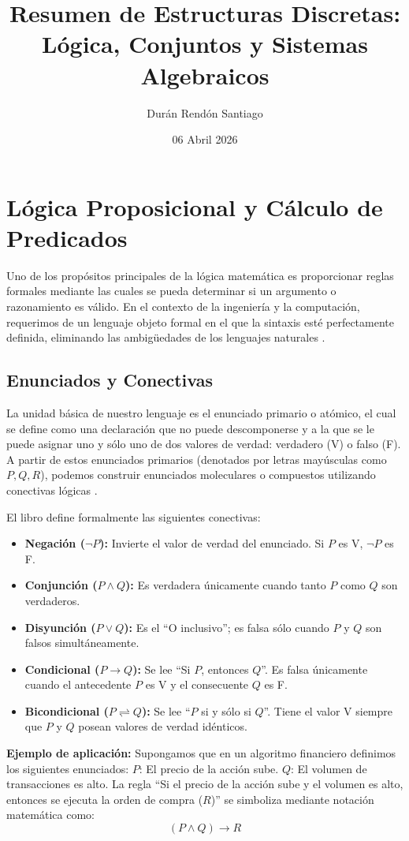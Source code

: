 \documentclass[12pt, letterpaper]{article}
\title{\textbf{Resumen de Estructuras Discretas: Lógica, Conjuntos y Sistemas Algebraicos}}
\author{Durán Rendón Santiago}
\date{06 Abril 2026}
\begin{document}


\tableofcontents

\section{Lógica Proposicional y Cálculo de Predicados}

Uno de los propósitos principales de la lógica matemática es proporcionar reglas formales mediante las cuales se pueda determinar si un argumento o razonamiento es válido. En el contexto de la ingeniería y la computación, requerimos de un lenguaje objeto formal en el que la sintaxis esté perfectamente definida, eliminando las ambigüedades de los lenguajes naturales \cite{tremblay2000matematicas}.

\subsection{Enunciados y Conectivas}
La unidad básica de nuestro lenguaje es el enunciado primario o atómico, el cual se define como una declaración que no puede descomponerse y a la que se le puede asignar uno y sólo uno de dos valores de verdad: verdadero (V) o falso (F). A partir de estos enunciados primarios (denotados por letras mayúsculas como $P, Q, R$), podemos construir enunciados moleculares o compuestos utilizando conectivas lógicas \cite{tremblay2000matematicas}.

El libro define formalmente las siguientes conectivas:
\begin{itemize}
    \item \textbf{Negación ($\neg P$):} Invierte el valor de verdad del enunciado. Si $P$ es V, $\neg P$ es F.
    \item \textbf{Conjunción ($P \wedge Q$):} Es verdadera únicamente cuando tanto $P$ como $Q$ son verdaderos.
    \item \textbf{Disyunción ($P \vee Q$):} Es el ``O inclusivo''; es falsa sólo cuando $P$ y $Q$ son falsos simultáneamente.
    \item \textbf{Condicional ($P \rightarrow Q$):} Se lee ``Si $P$, entonces $Q$''. Es falsa únicamente cuando el antecedente $P$ es V y el consecuente $Q$ es F.
    \item \textbf{Bicondicional ($P \rightleftharpoons Q$):} Se lee ``$P$ si y sólo si $Q$''. Tiene el valor V siempre que $P$ y $Q$ posean valores de verdad idénticos.
\end{itemize}

\textbf{Ejemplo de aplicación:}
Supongamos que en un algoritmo financiero definimos los siguientes enunciados:
$P$: El precio de la acción sube.
$Q$: El volumen de transacciones es alto.
La regla ``Si el precio de la acción sube y el volumen es alto, entonces se ejecuta la orden de compra ($R$)'' se simboliza mediante notación matemática como:
$$(P \wedge Q) \rightarrow R$$
\end{document}
